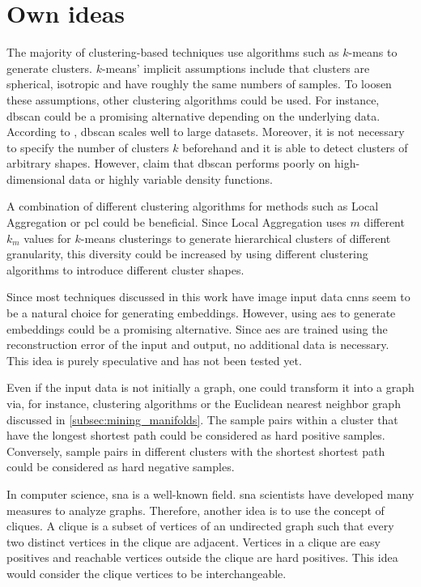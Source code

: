 \section{Own ideas}\label{sec:own_ideas}

The majority of clustering-based techniques use algorithms such as $k$-means to generate clusters.
$k$-means' implicit assumptions include that clusters are spherical, isotropic and have roughly the same numbers of samples. %
To loosen these assumptions, other clustering algorithms could be used.
For instance, \ac{dbscan} could be a promising alternative depending on the underlying data.
According to \citet{local_aggr_2019}, \ac{dbscan} scales well to large datasets.
Moreover, it is not necessary to specify the number of clusters $k$ beforehand and 
it is able to detect clusters of arbitrary shapes.
However, \citeauthor{local_aggr_2019} claim that \ac{dbscan} performs poorly on 
high-dimensional data or highly variable density functions.

A combination of different clustering algorithms for methods such as 
Local Aggregation \citet{local_aggr_2019} or \ac{pcl} \citet{PCL_2021} could be beneficial.
Since Local Aggregation uses $m$ different $k_m$ values for $k$-means clusterings 
to generate hierarchical clusters of different granularity, 
this diversity could be increased by using different clustering algorithms to introduce different cluster shapes.

Since most techniques discussed in this work have image input data \acp{cnn} seem to be a natural choice for generating embeddings.
However, using \acp{ae} to generate embeddings could be a promising alternative.
Since \acp{ae} are trained using the reconstruction error of the input and output, no additional data is necessary.
This idea is purely speculative and has not been tested yet.

Even if the input data is not initially a graph, one could transform it into a graph via, for instance, 
clustering algorithms or the Euclidean nearest neighbor graph discussed in \autoref{subsec:mining_manifolds}.
The sample pairs within a cluster that have the longest shortest path could be considered as hard positive samples.
Conversely, sample pairs in different clusters with the shortest shortest path could be considered as hard negative samples.

In computer science, \ac{sna} is a well-known field.
\ac{sna} scientists have developed many measures to analyze graphs.
Therefore, another idea is to use the concept of cliques.
A clique is a subset of vertices of an undirected graph such that every two distinct vertices in the clique are adjacent.
Vertices in a clique are easy positives and reachable vertices outside the clique are hard positives.
This idea would consider the clique vertices to be interchangeable.

